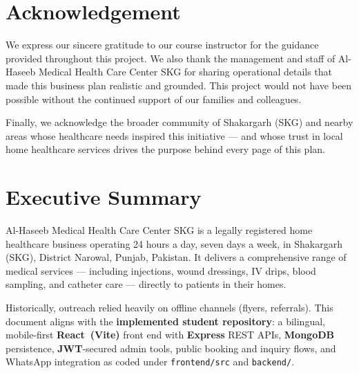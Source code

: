 \documentclass[12pt, a4paper]{article}
\begin{document}
\newpage

\tableofcontents
\thispagestyle{empty}
\newpage

\section*{Acknowledgement}

We express our sincere gratitude to our course instructor for the guidance provided throughout this project. We also thank the management and staff of Al-Haseeb Medical Health Care Center SKG for sharing operational details that made this business plan realistic and grounded. This project would not have been possible without the continued support of our families and colleagues.

Finally, we acknowledge the broader community of Shakargarh (SKG) and nearby areas whose healthcare needs inspired this initiative — and whose trust in local home healthcare services drives the purpose behind every page of this plan.

\newpage

\section*{Executive Summary}

Al-Haseeb Medical Health Care Center SKG is a legally registered home healthcare business operating 24 hours a day, seven days a week, in Shakargarh (SKG), District Narowal, Punjab, Pakistan. It delivers a comprehensive range of medical services --- including injections, wound dressings, IV drips, blood sampling, and catheter care --- directly to patients in their homes.

Historically, outreach relied heavily on offline channels (flyers, referrals). This document aligns with the \textbf{implemented student repository}: a bilingual, mobile-first \textbf{React~(Vite)} front end with \textbf{Express} REST APIs, \textbf{MongoDB} persistence, \textbf{JWT}-secured admin tools, public booking and inquiry flows, and WhatsApp integration as coded under \texttt{frontend/src} and \texttt{backend/}.
\end{document}
